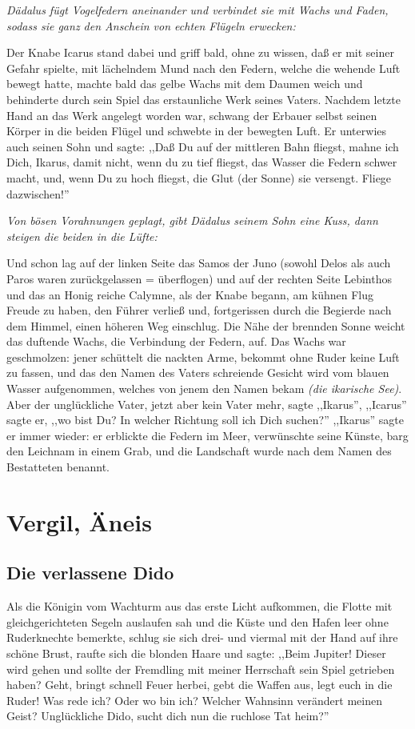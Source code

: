 \documentclass[a4paper]{article}
\begin{document}
\textit{Dädalus fügt Vogelfedern aneinander und verbindet sie mit Wachs und Faden, sodass sie ganz den Anschein von echten Flügeln erwecken:}

Der Knabe Icarus stand dabei und griff bald, ohne zu wissen, daß er mit seiner Gefahr spielte, mit lächelndem Mund nach den Federn, welche die wehende Luft bewegt hatte, machte bald das gelbe Wachs mit dem Daumen weich und behinderte durch sein Spiel das erstaunliche Werk seines Vaters. Nachdem letzte Hand an das Werk angelegt worden war, schwang der Erbauer selbst seinen Körper in die beiden Flügel und schwebte in der bewegten Luft. Er unterwies auch seinen Sohn und sagte: ,,Daß Du auf der mittleren Bahn fliegst, mahne ich Dich, Ikarus, damit nicht, wenn du zu tief fliegst, das Wasser die Federn schwer macht, und, wenn Du zu hoch fliegst, die Glut (der Sonne) sie versengt. Fliege dazwischen!''

\textit{Von bösen Vorahnungen geplagt, gibt Dädalus seinem Sohn eine Kuss, dann steigen die beiden in die Lüfte:}

Und schon lag auf der linken Seite das Samos der Juno (sowohl Delos als auch Paros waren zurückgelassen = überflogen) und auf der rechten Seite Lebinthos und das an Honig reiche Calymne, als der Knabe begann, am kühnen Flug Freude zu haben, den Führer verließ und, fortgerissen durch die Begierde nach dem Himmel, einen höheren Weg einschlug. Die Nähe der brennden Sonne weicht das duftende Wachs, die Verbindung der Federn, auf. Das Wachs war geschmolzen: jener schüttelt die nackten Arme, bekommt ohne Ruder keine Luft zu fassen, und das den Namen des Vaters schreiende Gesicht wird vom blauen Wasser aufgenommen, welches von jenem den Namen bekam \textit{(die ikarische See)}. Aber der unglückliche Vater, jetzt aber kein Vater mehr, sagte ,,Ikarus'', ,,Icarus'' sagte er, ,,wo bist Du? In welcher Richtung soll ich Dich suchen?'' ,,Ikarus'' sagte er immer wieder: er erblickte die Federn im Meer, verwünschte seine Künste, barg den Leichnam in einem Grab, und die Landschaft wurde nach dem Namen des Bestatteten benannt.

\section{Vergil, Äneis}
\subsection{Die verlassene Dido}
Als die Königin vom Wachturm aus das erste Licht aufkommen, die Flotte mit gleichgerichteten Segeln auslaufen sah und die Küste und den Hafen leer ohne Ruderknechte bemerkte, schlug sie sich drei- und viermal mit der Hand auf ihre schöne Brust, raufte sich die blonden Haare und sagte: ,,Beim Jupiter! Dieser wird gehen und sollte der Fremdling mit meiner Herrschaft sein Spiel getrieben haben? Geht, bringt schnell Feuer herbei, gebt die Waffen aus, legt euch in die Ruder! Was rede ich? Oder wo bin ich? Welcher Wahnsinn verändert meinen Geist? Unglückliche Dido, sucht dich nun die ruchlose Tat heim?''
\end{document}
